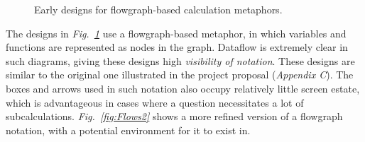 \documentclass[12pt,twoside,notitlepage,xetex]{report}
\begin{document}
\begin{center}
\begin{figure}[H]
\begin{center}
\end{center}
\caption{Early designs for flowgraph-based calculation metaphors.}
\label{fig:Flows1}
\end{figure}
\end{center}

The designs in \emph{Fig.~\ref{fig:Flows1}} use a flowgraph-based metaphor, in which variables and functions are represented as nodes in the graph.  Dataflow is extremely clear in such diagrams, giving these designs high \emph{visibility of notation}.  These designs are similar to the original one illustrated in the project proposal (\emph{Appendix C}).  The boxes and arrows used in such notation also occupy relatively little screen estate, which is advantageous in cases where a question necessitates a lot of subcalculations.  \emph{Fig.~\ref{fig:Flows2}} shows a more refined version of a flowgraph notation, with a potential environment for it to exist in.
\end{document}
